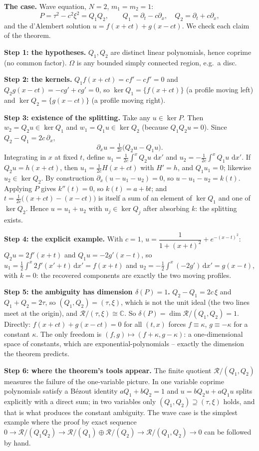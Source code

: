 \documentclass[11pt]{article}
\theoremstyle{plain}
\theoremstyle{definition}
\theoremstyle{remark}
\newcommand{\C}{\mathbb{C}}
\newcommand{\ring}{\mathcal{R}}            %
\newcommand{\dd}{\,\mathrm{d}}
\begin{document}
\medskip\textbf{The case.} Wave equation, $N=2$, $m_1=m_2=1$:
\[
P=\tau^2-c^2\xi^2=Q_1Q_2,\qquad Q_1=\partial_t-c\partial_x,\quad Q_2=\partial_t+c\partial_x,
\]
and the d'Alembert solution $u=f(x+ct)+g(x-ct)$. We check each claim of the theorem.

\medskip\textbf{Step 1: the hypotheses.} $Q_1,Q_2$ are distinct linear polynomials, hence coprime (no common factor). $\Omega$ is any bounded simply connected region, e.g.\ a disc.

\medskip\textbf{Step 2: the kernels.} $Q_1f(x+ct)=cf'-cf'=0$ and $Q_2g(x-ct)=-cg'+cg'=0$, so $\ker Q_1=\{f(x+ct)\}$ (a profile moving left) and $\ker Q_2=\{g(x-ct)\}$ (a profile moving right).

\medskip\textbf{Step 3: existence of the splitting.} Take any $u\in\ker P$. Then $w_2=Q_2u\in\ker Q_1$ and $w_1=Q_1u\in\ker Q_2$ (because $Q_1Q_2u=0$). Since $Q_2-Q_1=2c\,\partial_x$,
\[
\partial_xu=\tfrac1{2c}\big(Q_2u-Q_1u\big).
\]
Integrating in $x$ at fixed $t$, define $u_1=\tfrac1{2c}\int^xQ_2u\,\dd x'$ and $u_2=-\tfrac1{2c}\int^xQ_1u\,\dd x'$. If $Q_2u=h(x+ct)$, then $u_1=\tfrac1{2c}H(x+ct)$ with $H'=h$, and $Q_1u_1=0$; likewise $u_2\in\ker Q_2$. By construction $\partial_x(u-u_1-u_2)=0$, so $u-u_1-u_2=k(t)$. Applying $P$ gives $k''(t)=0$, so $k(t)=a+bt$; and $t=\tfrac1{2c}\big((x+ct)-(x-ct)\big)$ is itself a sum of an element of $\ker Q_1$ and one of $\ker Q_2$. Hence $u=u_1+u_2$ with $u_j\in\ker Q_j$ after absorbing $k$: the splitting exists.

\medskip\textbf{Step 4: the explicit example.} With $c=1$, $u=\dfrac1{1+(x+t)^2}+e^{-(x-t)^2}$: $Q_2u=2f'(x+t)$ and $Q_1u=-2g'(x-t)$, so $u_1=\tfrac12\int^x2f'(x'+t)\dd x'=f(x+t)$ and $u_2=-\tfrac12\int^x(-2g')\dd x'=g(x-t)$, with $k=0$: the recovered components are exactly the two moving profiles.

\medskip\textbf{Step 5: the ambiguity has dimension $\delta(P)=1$.} $Q_2-Q_1=2c\,\xi$ and $Q_1+Q_2=2\tau$, so $(Q_1,Q_2)=(\tau,\xi)$, which is not the unit ideal (the two lines meet at the origin), and $\ring/(\tau,\xi)\cong\C$. So $\delta(P)=\dim\ring/(Q_1,Q_2)=1$. Directly: $f(x+ct)+g(x-ct)=0$ for all $(t,x)$ forces $f\equiv\kappa$, $g\equiv-\kappa$ for a constant $\kappa$. The only freedom is $(f,g)\mapsto(f+\kappa,g-\kappa)$: a one-dimensional space of constants, which are exponential-polynomials -- exactly the dimension the theorem predicts.

\medskip\textbf{Step 6: where the theorem's tools appear.} The finite quotient $\ring/(Q_1,Q_2)$ measures the failure of the one-variable picture. In one variable coprime polynomials satisfy a B\'ezout identity $aQ_1+bQ_2=1$ and $u=bQ_2u+aQ_1u$ splits explicitly with a direct sum; in two variables only $(Q_1,Q_2)\supseteq(\tau,\xi)$ holds, and that is what produces the constant ambiguity. The wave case is the simplest example where the proof by exact sequence $0\to\ring/(Q_1Q_2)\to\ring/(Q_1)\oplus\ring/(Q_2)\to\ring/(Q_1,Q_2)\to0$ can be followed by hand.
\end{document}
